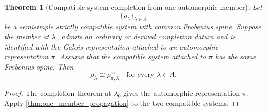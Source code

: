 \documentclass[11pt]{amsart}
\newtheorem{theorem}{Theorem}[section]
\theoremstyle{definition}
\theoremstyle{remark}
\begin{document}
\begin{theorem}[Compatible system completion from one automorphic member]\label{thm:system_completion}
Let
\[
\{\rho_\lambda\}_{\lambda\in\Lambda}
\]
be a semisimple strictly compatible system with common Frobenius spine. Suppose the member at \(\lambda_0\) admits an ordinary or derived completion datum and is identified with the Galois representation attached to an automorphic representation \(\pi\). Assume that the compatible system attached to \(\pi\) has the same Frobenius spine. Then
\[
\boxed{
\rho_\lambda
\cong
\rho_{\pi,\lambda}^{\mathrm{ss}}
\quad
\text{for every }\lambda\in\Lambda.
}
\]
\end{theorem}

\begin{proof}
The completion theorem at \(\lambda_0\) gives the automorphic representation \(\pi\). Apply \cref{thm:one_member_propagation} to the two compatible systems.
\end{proof}
\end{document}
